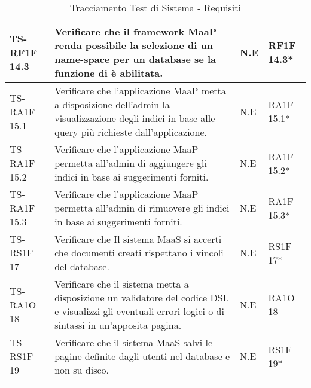 \begin{center}
\begin{longtable}{| p{3cm} | p{6cm} | p{1.5cm} | p{2cm} | }
				TS-RF1F 14.3 & 
				Verificare che il framework MaaP renda possibile la selezione di un name-space per un database se la funzione di \glossario{namespace} è abilitata. & N.E & RF1F 14.3*  \newline  \\ \hline 
				TS-RA1F 15.1 & 
				Verificare che l’applicazione MaaP metta a disposizione dell’admin la visualizzazione degli indici in base alle query più richieste dall’applicazione. & N.E & RA1F 15.1*  \newline  \\ \hline 
				TS-RA1F 15.2 & 
				Verificare che l’applicazione MaaP permetta all’admin di aggiungere gli indici in base ai suggerimenti forniti. & N.E & RA1F 15.2*  \newline  \\ \hline 
				TS-RA1F 15.3 & 
				Verificare che l’applicazione MaaP permetta all’admin di rimuovere gli indici in base ai suggerimenti forniti. & N.E & RA1F 15.3*  \newline  \\ \hline 
				TS-RS1F 17 & 
				Verificare che Il sistema MaaS si accerti che documenti creati rispettano i vincoli del database. & N.E & RS1F 17*  \newline  \\ \hline 
				TS-RA1O 18 & 
				Verificare che il sistema metta a disposizione un validatore del codice DSL e visualizzi gli eventuali errori logici o di sintassi in un'apposita pagina. & N.E & RA1O 18 \newline  \\ \hline 
				TS-RS1F 19 & 
				Verificare che il sistema MaaS salvi le pagine definite dagli utenti nel database e non su disco. & N.E & RS1F 19*  \newline  \\ \hline 
		\caption{Tracciamento Test di Sistema - Requisiti}
		\end{longtable}
	 \egroup
\end{center}